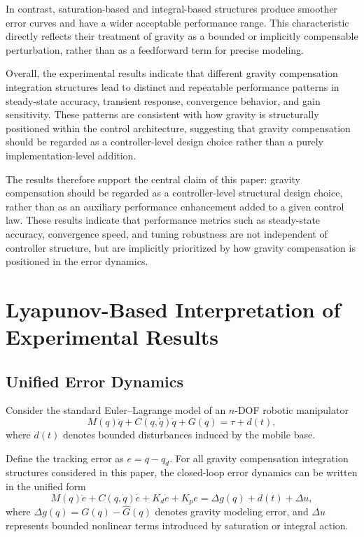 \documentclass[conference]{IEEEtran}
\begin{document}
In contrast, saturation-based and integral-based structures produce smoother error curves and have a wider acceptable performance range. This characteristic directly reflects their treatment of gravity as a bounded or implicitly compensable perturbation, rather than as a feedforward term for precise modeling.


Overall, the experimental results indicate that different gravity compensation integration structures lead to distinct and repeatable performance patterns in steady-state accuracy, transient response, convergence behavior, and gain sensitivity. These patterns are consistent with how gravity is structurally positioned within the control architecture, suggesting that gravity compensation should be regarded as a controller-level design choice rather than a purely implementation-level addition.

The results therefore support the central claim of this paper: gravity compensation should be regarded as a controller-level structural design choice, rather than as an auxiliary performance enhancement added to a given control law. These results indicate that performance metrics such as steady-state accuracy, convergence speed, and tuning robustness are not independent of controller structure, but are implicitly prioritized by how gravity compensation is positioned in the error dynamics.




\section{Lyapunov-Based Interpretation of Experimental Results}

\subsection{Unified Error Dynamics}
Consider the standard Euler--Lagrange model of an $n$-DOF robotic manipulator
\begin{equation}
	M(q)\ddot q + C(q,\dot q)\dot q + G(q) = \tau + d(t),
\end{equation}
where $d(t)$ denotes bounded disturbances induced by the mobile base.

Define the tracking error as $e = q - q_d$. For all gravity compensation integration structures considered in this paper, the closed-loop error dynamics can be written in the unified form
\begin{equation}
	M(q)\ddot e + C(q,\dot q)\dot e + K_d \dot e + K_p e
	= \Delta g(q) + d(t) + \Delta u,
	\label{eq:unified_error}
\end{equation}
where $\Delta g(q)=G(q)-\hat G(q)$ denotes gravity modeling error, and $\Delta u$ represents bounded nonlinear terms introduced by saturation or integral action.
\end{document}
